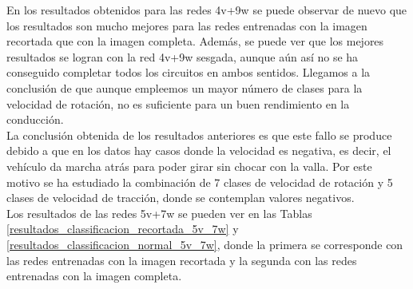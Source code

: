 En los resultados obtenidos para las redes 4v+9w se puede observar de nuevo que los resultados son mucho mejores para las redes entrenadas con la imagen recortada que con la imagen completa. Además, se puede ver que los mejores resultados se logran con la red 4v+9w sesgada, aunque aún así no se ha conseguido completar todos los circuitos en ambos sentidos. Llegamos a la conclusión de que aunque empleemos un mayor número de clases para la velocidad de rotación, no es suficiente para un buen rendimiento en la conducción.\\

La conclusión obtenida de los resultados anteriores es que este fallo se produce debido a que en los datos hay casos donde la velocidad es negativa, es decir, el vehículo da marcha atrás para poder girar sin chocar con la valla. Por este motivo se ha estudiado la combinación de 7 clases de velocidad de rotación y 5 clases de velocidad de tracción, donde se contemplan valores negativos.\\

Los resultados de las redes 5v+7w se pueden ver en las Tablas \ref{resultados_classificacion_recortada_5v_7w} y \ref{resultados_classificacion_normal_5v_7w}, donde la primera se corresponde con las redes entrenadas con la imagen recortada y la segunda con las redes entrenadas con la imagen completa.\\


